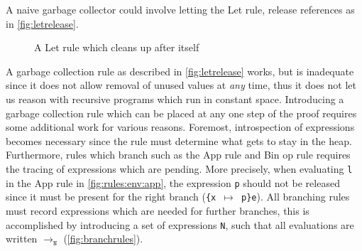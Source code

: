 A naive garbage collector could involve letting the Let rule, release references as in \autoref{fig:letrelease}. 
\begin{figure}[ht]
  \begin{mdframed}
    \begin{prooftree}
    \end{prooftree}   
  \end{mdframed}
  \caption{A Let rule which cleans up after itself}
  \label{fig:letrelease}
\end{figure}
A garbage collection rule as described in \autoref{fig:letrelease} works, but is inadequate since it does not allow removal of unused values at \textit{any} time, thus it does not let us reason with recursive programs which run in constant space.
Introducing a garbage collection rule which can be placed at any one step of the proof requires some additional work for various reasons.
Foremost, introspection of expressions becomes necessary since the rule must determine what gets to stay in the heap.
Furthermore, rules which branch such as the App rule and Bin op rule requires the tracing of expressions which are pending.
More precisely, when evaluating \texttt{l} in the App rule in \autoref{fig:rules:env:app}, the expression \texttt{p} should not be released since it must be present for the right branch (\texttt{\{x $\mapsto$ p\}e}).
All branching rules must record expressions which are needed for further branches, this is accomplished by introducing a set of expressions \texttt{N}, such that all evaluations are written $\rightarrow_{\texttt{N}}$ (\autoref{fig:branchrules}).
